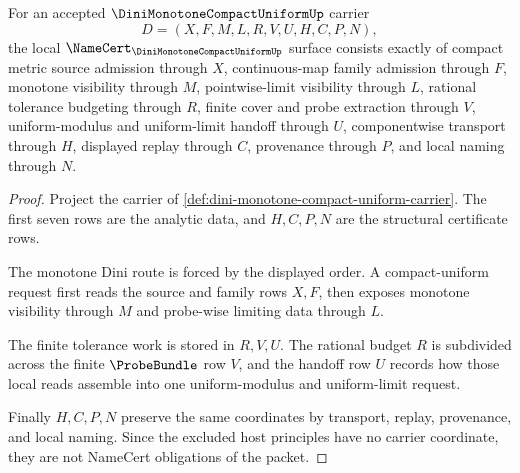\begin{theorem}
\label{thm:dini-monotone-compact-uniform-carrier-obligations}
For an accepted $\DiniMonotoneCompactUniformUp$ carrier
$$
D=(X,F,M,L,R,V,U,H,C,P,N),
$$
the local $\NameCert_{\DiniMonotoneCompactUniformUp}$ surface consists exactly of compact metric source admission through $X$, continuous-map family admission through $F$, monotone visibility through $M$, pointwise-limit visibility through $L$, rational tolerance budgeting through $R$, finite cover and probe extraction through $V$, uniform-modulus and uniform-limit handoff through $U$, componentwise transport through $H$, displayed replay through $C$, provenance through $P$, and local naming through $N$.
\end{theorem}
\begin{proof}
Project the carrier of \autoref{def:dini-monotone-compact-uniform-carrier}. The first seven rows are the analytic data, and $H,C,P,N$ are the structural certificate rows.

The monotone Dini route is forced by the displayed order. A compact-uniform request first reads the source and family rows $X,F$, then exposes monotone visibility through $M$ and probe-wise limiting data through $L$.

The finite tolerance work is stored in $R,V,U$. The rational budget $R$ is subdivided across the finite $\ProbeBundle$ row $V$, and the handoff row $U$ records how those local reads assemble into one uniform-modulus and uniform-limit request.

Finally $H,C,P,N$ preserve the same coordinates by transport, replay, provenance, and local naming. Since the excluded host principles have no carrier coordinate, they are not NameCert obligations of the packet.
\end{proof}

